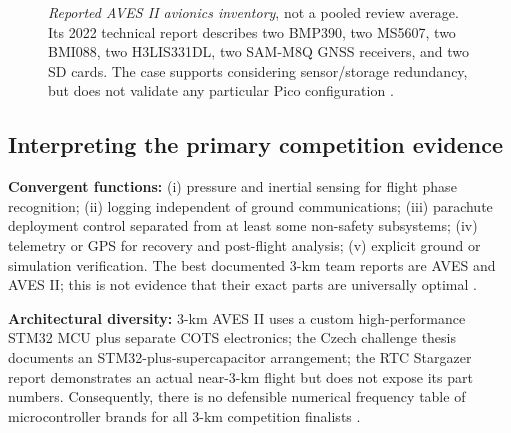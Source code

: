 \documentclass[10pt,a4paper]{article}
\begin{document}
\begin{figure}[htbp]\centering
{}
\caption{\emph{Reported AVES II avionics inventory}, not a pooled review average. Its 2022 technical report describes two BMP390, two MS5607, two BMI088, two H3LIS331DL, two SAM-M8Q GNSS receivers, and two SD cards. The case supports considering sensor/storage redundancy, but does not validate any particular Pico configuration \cite{astg2022aves2}.}
\label{fig:aves2}
\end{figure}

\subsection{Interpreting the primary competition evidence}
\textbf{Convergent functions:} (i) pressure and inertial sensing for flight phase recognition; (ii) logging independent of ground communications; (iii) parachute deployment control separated from at least some non-safety subsystems; (iv) telemetry or GPS for recovery and post-flight analysis; (v) explicit ground or simulation verification. The best documented 3-km team reports are AVES and AVES II; this is not evidence that their exact parts are universally optimal \cite{astg2021aves,astg2022aves2}.

\textbf{Architectural diversity:} 3-km AVES II uses a custom high-performance STM32 MCU plus separate COTS electronics; the Czech challenge thesis documents an STM32-plus-supercapacitor arrangement; the RTC Stargazer report demonstrates an actual near-3-km flight but does not expose its part numbers. Consequently, there is no defensible numerical frequency table of microcontroller brands for all 3-km competition finalists \cite{astg2022aves2,zapadlo2023,stargazer2026}.
\end{document}
